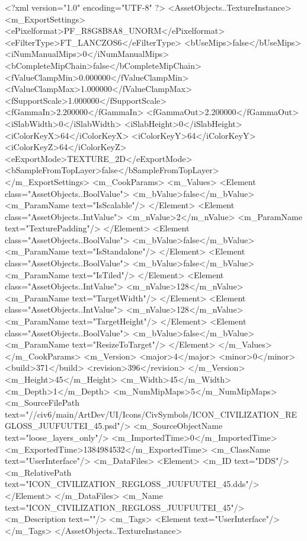 <?xml version="1.0" encoding="UTF-8" ?>
<AssetObjects..TextureInstance>
	<m_ExportSettings>
		<ePixelformat>PF_R8G8B8A8_UNORM</ePixelformat>
		<eFilterType>FT_LANCZOS6</eFilterType>
		<bUseMips>false</bUseMips>
		<iNumManualMips>0</iNumManualMips>
		<bCompleteMipChain>false</bCompleteMipChain>
		<fValueClampMin>0.000000</fValueClampMin>
		<fValueClampMax>1.000000</fValueClampMax>
		<fSupportScale>1.000000</fSupportScale>
		<fGammaIn>2.200000</fGammaIn>
		<fGammaOut>2.200000</fGammaOut>
		<iSlabWidth>0</iSlabWidth>
		<iSlabHeight>0</iSlabHeight>
		<iColorKeyX>64</iColorKeyX>
		<iColorKeyY>64</iColorKeyY>
		<iColorKeyZ>64</iColorKeyZ>
		<eExportMode>TEXTURE_2D</eExportMode>
		<bSampleFromTopLayer>false</bSampleFromTopLayer>
	</m_ExportSettings>
	<m_CookParams>
		<m_Values>
			<Element class="AssetObjects..BoolValue">
				<m_bValue>false</m_bValue>
				<m_ParamName text="IsScalable"/>
			</Element>
			<Element class="AssetObjects..IntValue">
				<m_nValue>2</m_nValue>
				<m_ParamName text="TexturePadding"/>
			</Element>
			<Element class="AssetObjects..BoolValue">
				<m_bValue>false</m_bValue>
				<m_ParamName text="IsStandalone"/>
			</Element>
			<Element class="AssetObjects..BoolValue">
				<m_bValue>false</m_bValue>
				<m_ParamName text="IsTiled"/>
			</Element>
			<Element class="AssetObjects..IntValue">
				<m_nValue>128</m_nValue>
				<m_ParamName text="TargetWidth"/>
			</Element>
			<Element class="AssetObjects..IntValue">
				<m_nValue>128</m_nValue>
				<m_ParamName text="TargetHeight"/>
			</Element>
			<Element class="AssetObjects..BoolValue">
				<m_bValue>false</m_bValue>
				<m_ParamName text="ResizeToTarget"/>
			</Element>
		</m_Values>
	</m_CookParams>
	<m_Version>
		<major>4</major>
		<minor>0</minor>
		<build>371</build>
		<revision>396</revision>
	</m_Version>
	<m_Height>45</m_Height>
	<m_Width>45</m_Width>
	<m_Depth>1</m_Depth>
	<m_NumMipMaps>5</m_NumMipMaps>
	<m_SourceFilePath text="//civ6/main/ArtDev/UI/Icons/CivSymbols/ICON_CIVILIZATION_REGLOSS_JUUFUUTEI_45.psd"/>
	<m_SourceObjectName text="loose_layers_only"/>
	<m_ImportedTime>0</m_ImportedTime>
	<m_ExportedTime>1384984532</m_ExportedTime>
	<m_ClassName text="UserInterface"/>
	<m_DataFiles>
		<Element>
			<m_ID text="DDS"/>
			<m_RelativePath text="ICON_CIVILIZATION_REGLOSS_JUUFUUTEI_45.dds"/>
		</Element>
	</m_DataFiles>
	<m_Name text="ICON_CIVILIZATION_REGLOSS_JUUFUUTEI_45"/>
	<m_Description text=""/>
	<m_Tags>
		<Element text="UserInterface"/>
	</m_Tags>
</AssetObjects..TextureInstance>

